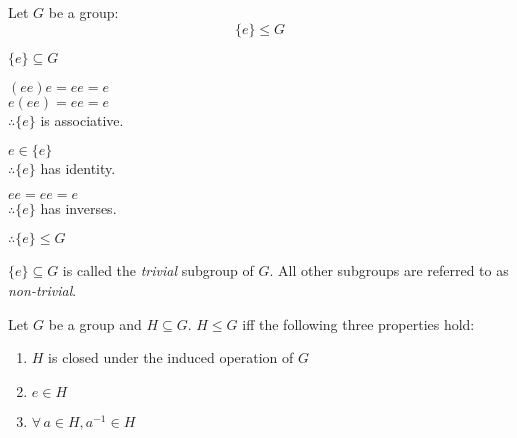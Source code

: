 \documentclass[letterpaper,12pt,fleqn]{article}
\begin{document}
\begin{example}
  \begin{minipage}{3in}
    \setlength{\leftskip}{0.75in}
  \end{minipage}
  \begin{minipage}{3in}
  \end{minipage}
\end{example}

\begin{theorem}
  Let $G$ be a group:
  \[\{e\}\le G\]
\end{theorem}

\begin{theproof}
  $\{e\}\subseteq G$
  
  $(ee)e=ee=e$ \\
  $e(ee)=ee=e$ \\
  $\therefore \{e\}$ is associative.

  $e\in\{e\}$ \\
  $\therefore \{e\}$ has identity.

  $ee=ee=e$ \\
  $\therefore \{e\}$ has inverses.

  $\therefore \{e\}\le G$
\end{theproof}

\begin{definition}
  $\{e\}\subseteq G$ is called the \emph{trivial} subgroup of $G$. All other
  subgroups are referred to as \emph{non-trivial}.
\end{definition}

\begin{theorem}
  Let $G$ be a group and $H\subseteq G$. $H\le G$ iff the following three
  properties hold:
  \begin{enumerate}
  \item{$H$ is closed under the induced operation of $G$}
  \item{$e\in H$}
  \item{$\forall\,a\in H,a^{-1}\in H$}
  \end{enumerate}
\end{theorem}
\end{document}
